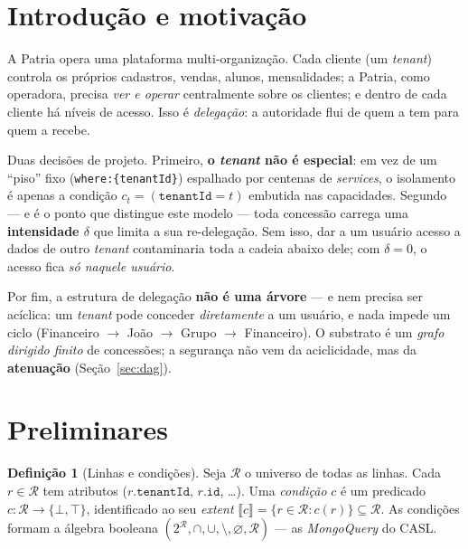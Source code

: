 \documentclass[11pt,a4paper]{article}
\theoremstyle{definition}
\newtheorem{definition}[theorem]{Definição}
\newcommand{\R}{\mathcal{R}}
\newcommand{\ext}[1]{\llbracket #1 \rrbracket}
\newcommand{\tenant}{\texttt{tenantId}}
\newcommand{\dep}{\delta}
\begin{document}
\tableofcontents
\bigskip

\section{Introdução e motivação}

A Patria opera uma plataforma multi-organização. Cada cliente (um
\emph{tenant}) controla os próprios cadastros, vendas, alunos, mensalidades;
a Patria, como operadora, precisa \emph{ver e operar} centralmente sobre os
clientes; e dentro de cada cliente há níveis de acesso. Isso é
\emph{delegação}: a autoridade flui de quem a tem para quem a recebe.

Duas decisões de projeto. Primeiro, \textbf{o \emph{tenant} não é especial}:
em vez de um ``piso'' fixo (\texttt{where:\{tenantId\}}) espalhado por
centenas de \emph{services}, o isolamento é apenas a condição
$c_t=(\tenant=t)$ embutida nas capacidades. Segundo --- e é o ponto que
distingue este modelo --- toda concessão carrega uma \textbf{intensidade
$\dep$} que limita a sua re-delegação. Sem isso, dar a um usuário acesso a
dados de outro \emph{tenant} contaminaria toda a cadeia abaixo dele; com
$\dep=0$, o acesso fica \emph{só naquele usuário}.

Por fim, a estrutura de delegação \textbf{não é uma árvore} --- e nem precisa
ser acíclica: um \emph{tenant} pode conceder \emph{diretamente} a um usuário,
e nada impede um ciclo (Financeiro $\to$ João $\to$ Grupo $\to$ Financeiro).
O substrato é um \emph{grafo dirigido finito} de concessões; a segurança não
vem da aciclicidade, mas da \textbf{atenuação} (Seção~\ref{sec:dag}).

\section{Preliminares}

\begin{definition}[Linhas e condições]
Seja $\R$ o universo de todas as linhas. Cada $r\in\R$ tem atributos
($r.\tenant$, $r.\texttt{id}$, \dots). Uma \emph{condição} $c$ é um predicado
$c:\R\to\{\bot,\top\}$, identificado ao seu \emph{extent}
$\ext{c}=\{r\in\R:c(r)\}\subseteq\R$. As condições formam a álgebra booleana
$(2^{\R},\cap,\cup,\setminus,\varnothing,\R)$ --- as \emph{MongoQuery} do CASL.
\end{definition}
\end{document}

